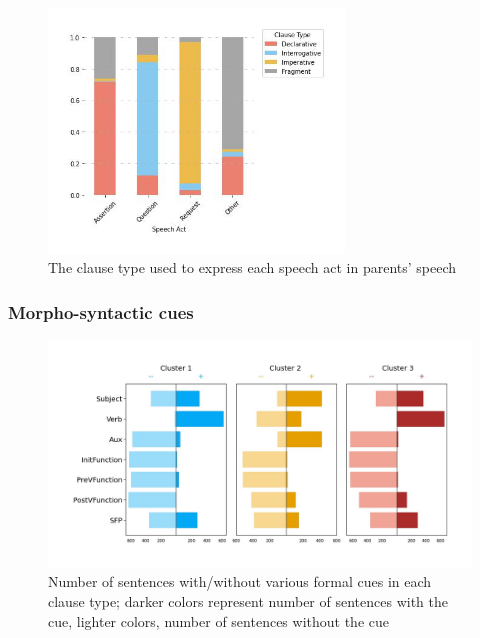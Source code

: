 \begin{figure}[H]
    \centering
    \includegraphics[width=0.7\textwidth]{figures/man-real-spcl.jpg}
    \caption{The clause type used to express each speech act in parents' speech}
    \label{fig:man-real-spcl}
\end{figure}

\subsubsection{Morpho-syntactic cues}
\label{sec:mancl:corpus:results:syn}


\begin{figure}[H]
    \centering
    \includegraphics[width=1\textwidth]{figures/man-baseline-conservative-syncluster.jpg}
    \caption{Number of sentences with/without various formal cues in each clause type; darker colors represent number of sentences with the cue, lighter colors, number of sentences without the cue }
    \label{fig:man-real-syncluster}
\end{figure}




